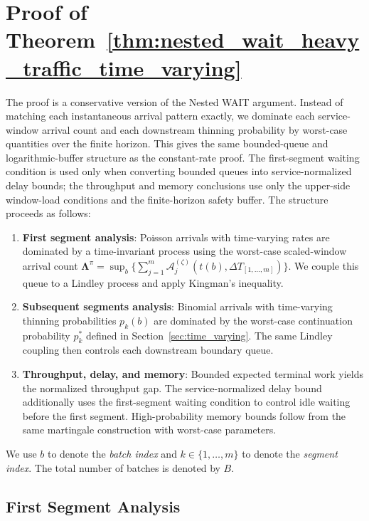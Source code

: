 
\section{Proof of Theorem~\ref{thm:nested_wait_heavy_traffic_time_varying}}\label{appendix:: proof of nested optimality, time varying.}

The proof is a conservative version of the Nested WAIT argument. Instead of matching each instantaneous arrival pattern exactly, we dominate each service-window arrival count and each downstream thinning probability by worst-case quantities over the finite horizon. This gives the same bounded-queue and logarithmic-buffer structure as the constant-rate proof. The first-segment waiting condition is used only when converting bounded queues into service-normalized delay bounds; the throughput and memory conclusions use only the upper-side window-load conditions and the finite-horizon safety buffer. The structure proceeds as follows:
\begin{enumerate}
    \item \textbf{First segment analysis}: Poisson arrivals with time-varying rates are dominated by a time-invariant process using the worst-case scaled-window arrival count $\mathbf{\Lambda}^{\pi} = \sup_b \{\sum_{j=1}^m \mathcal A_j^{(\zeta)}(t(b),\Delta T_{[1,\ldots,m]})\}$. We couple this queue to a Lindley process and apply Kingman's inequality.
    \item \textbf{Subsequent segments analysis}: Binomial arrivals with time-varying thinning probabilities $p_k(b)$ are dominated by the worst-case continuation probability \(p_k^*\) defined in Section~\ref{sec:time_varying}. The same Lindley coupling then controls each downstream boundary queue.
    \item \textbf{Throughput, delay, and memory}: Bounded expected terminal work yields the normalized throughput gap. The service-normalized delay bound additionally uses the first-segment waiting condition to control idle waiting before the first segment. High-probability memory bounds follow from the same martingale construction with worst-case parameters.
\end{enumerate}

We use $b$ to denote the \emph{batch index} and $k \in \{1, \ldots, m\}$ to denote the \emph{segment index}. The total number of batches is denoted by $B$.

\subsection{First Segment Analysis}

